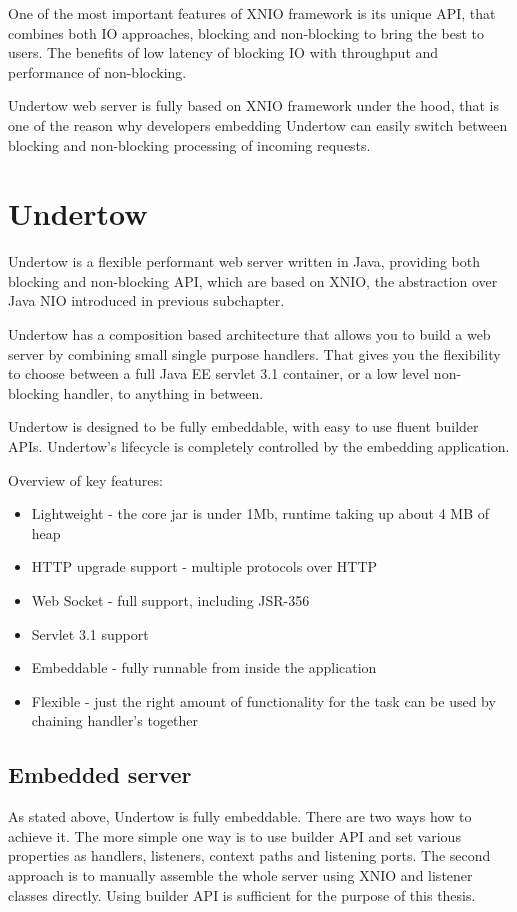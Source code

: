 \documentclass[12pt,final,oneside]{fithesis2}
\begin{document}
One of the most important features of XNIO framework is its unique API, that combines both IO approaches, blocking and non-blocking to bring the best to users. The benefits of low latency of blocking IO with throughput and performance of non-blocking.

  Undertow web server is fully based on XNIO framework under the hood, that is one of the reason why developers embedding Undertow can easily switch between blocking and non-blocking processing of incoming requests.  

\section{Undertow}

Undertow is a flexible performant web server written in Java, providing both blocking and non-blocking API, which are based on XNIO, the abstraction over Java NIO introduced in previous subchapter.

Undertow has a composition based architecture that allows you to build a web server by combining small single purpose handlers. That gives you the flexibility to choose between a full Java EE servlet 3.1 container, or a low level non-blocking handler, to anything in between.

Undertow is designed to be fully embeddable, with easy to use fluent builder APIs. Undertow’s lifecycle is completely controlled by the embedding application.

Overview of key features:
\begin{itemize}
\item Lightweight - the core jar is under 1Mb, runtime taking up about 4 MB of heap
\item HTTP upgrade support - multiple protocols over HTTP
\item Web Socket -  full support, including JSR-356
\item Servlet 3.1 support 
\item Embeddable - fully runnable from inside the application
\item Flexible - just the right amount of functionality for the task can be used by chaining handler's together
\end{itemize}

\subsection{Embedded server}
As stated above, Undertow is fully embeddable. There are two ways how to achieve it. The more simple one way is  to use builder API and set various properties as handlers, listeners, context paths and listening ports. The second approach is to manually assemble the whole server using XNIO and listener classes directly. Using builder API is sufficient for the purpose of this thesis.
\end{document}
